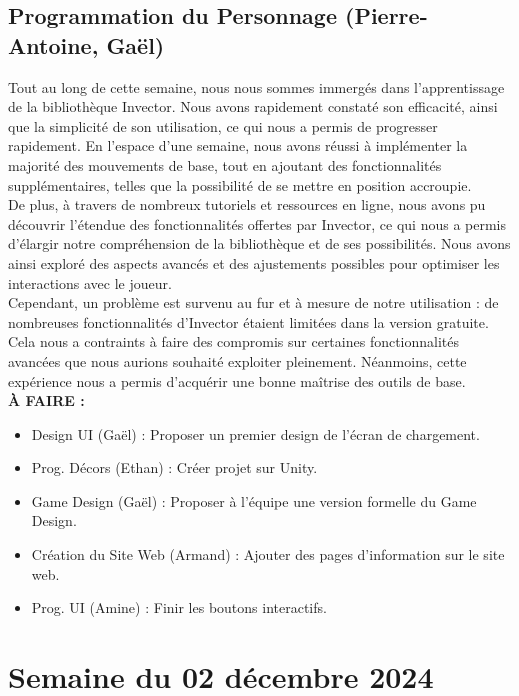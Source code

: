 \documentclass{report}
\begin{document}
\newpage %

\subsection*{Programmation du Personnage (Pierre-Antoine, Gaël)}
Tout au long de cette semaine, nous nous sommes immergés dans l’apprentissage de la bibliothèque Invector. Nous avons rapidement constaté son efficacité, ainsi que la simplicité de son utilisation, ce qui nous a permis de progresser rapidement. En l’espace d’une semaine, nous avons réussi à implémenter la majorité des mouvements de base, tout en ajoutant des fonctionnalités supplémentaires, telles que la possibilité de se mettre en position accroupie.
\\[0.4cm]
De plus, à travers de nombreux tutoriels et ressources en ligne, nous avons pu découvrir l’étendue des fonctionnalités offertes par Invector, ce qui nous a permis d’élargir notre compréhension de la bibliothèque et de ses possibilités. Nous avons ainsi exploré des aspects avancés et des ajustements possibles pour optimiser les interactions avec le joueur.
\\[0.4cm]
Cependant, un problème est survenu au fur et à mesure de notre utilisation : de nombreuses fonctionnalités d’Invector étaient limitées dans la version gratuite. Cela nous a contraints à faire des compromis sur certaines fonctionnalités avancées que nous aurions souhaité exploiter pleinement. Néanmoins, cette expérience nous a permis d’acquérir une bonne maîtrise des outils de base.
\\[1cm]
\textbf{À FAIRE :}
\begin{itemize}
    \item Design UI (Gaël) : Proposer un premier design de l'écran de chargement.
    \item Prog. Décors (Ethan) : Créer projet sur Unity.
    \item Game Design (Gaël) : Proposer à l'équipe une version formelle du Game Design.
    \item Création du Site Web (Armand) : Ajouter des pages d'information sur le site web.
    \item Prog. UI (Amine) : Finir les boutons interactifs.
\end{itemize}





\newpage
\section{Semaine du 02 décembre 2024}
\end{document}
